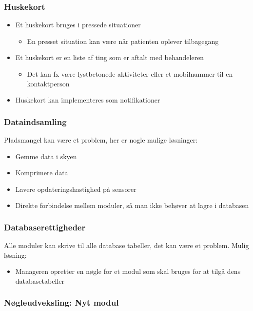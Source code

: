 \begin{frame}
\frametitle{Huskekort}
\begin{itemize}
\item Et huskekort bruges i pressede situationer
\begin{itemize}
	\item En presset situation kan være når patienten oplever tilbagegang
\end{itemize}
\item Et huskekort er en liste af ting som er aftalt med behandeleren
\begin{itemize}
	\item Det kan fx være lystbetonede aktiviteter eller et mobilnummer til en kontaktperson
\end{itemize} 
\item Huskekort kan implementeres som notifikationer
\end{itemize}
\end{frame}

\begin{frame}
\frametitle{Dataindsamling}
Pladsmangel kan være et problem, her er nogle mulige løsninger:
\begin{itemize}
\item Gemme data i skyen
\item Komprimere data
\item Lavere opdateringshastighed på sensorer
\item Direkte forbindelse mellem moduler, så man ikke behøver at lagre i databasen
\end{itemize}
\end{frame}

\begin{frame}
\frametitle{Databaserettigheder}
Alle moduler kan skrive til alle database tabeller, det kan være et problem.
Mulig løsning:
\begin{itemize}
\item Manageren opretter en nøgle for et modul som skal bruges for at tilgå dens databasetabeller
\end{itemize}
\end{frame}

\begin{frame}
	\frametitle{Nøgleudveksling: Nyt modul}
\end{frame}

